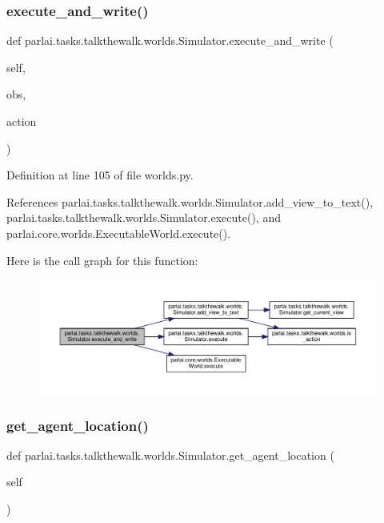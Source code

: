 \subsubsection{\texorpdfstring{execute\+\_\+and\+\_\+write()}{execute\_and\_write()}}
{\footnotesize\ttfamily def parlai.\+tasks.\+talkthewalk.\+worlds.\+Simulator.\+execute\+\_\+and\+\_\+write (\begin{DoxyParamCaption}\item[{}]{self,  }\item[{}]{obs,  }\item[{}]{action }\end{DoxyParamCaption})}



Definition at line 105 of file worlds.\+py.



References parlai.\+tasks.\+talkthewalk.\+worlds.\+Simulator.\+add\+\_\+view\+\_\+to\+\_\+text(), parlai.\+tasks.\+talkthewalk.\+worlds.\+Simulator.\+execute(), and parlai.\+core.\+worlds.\+Executable\+World.\+execute().

Here is the call graph for this function\+:
\nopagebreak
\begin{figure}[H]
\begin{center}
\leavevmode
\includegraphics[width=350pt]{classparlai_1_1tasks_1_1talkthewalk_1_1worlds_1_1Simulator_ae196cf0b53564026703d3ebbd4e741eb_cgraph}
\end{center}
\end{figure}
\mbox{\label{classparlai_1_1tasks_1_1talkthewalk_1_1worlds_1_1Simulator_ae3cf085288804e12b1d8e70e22f1017e}} 
\subsubsection{\texorpdfstring{get\+\_\+agent\+\_\+location()}{get\_agent\_location()}}
{\footnotesize\ttfamily def parlai.\+tasks.\+talkthewalk.\+worlds.\+Simulator.\+get\+\_\+agent\+\_\+location (\begin{DoxyParamCaption}\item[{}]{self }\end{DoxyParamCaption})}



